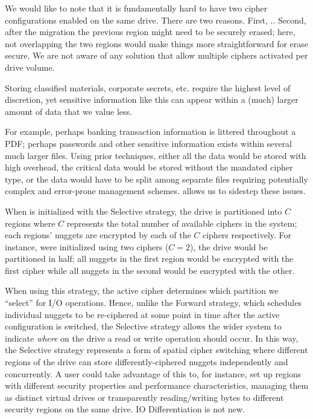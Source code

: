 We would like to note that it is fundamentally hard to have two cipher
configurations enabled on the same drive. There are two reasons. First,
.. Second, after the migration the
previous region might need to be securely erased; here, not overlapping the two
regions would make things more straightforward for erase secure. We are not
aware of any solution that allow multiple ciphers activated per drive volume.



 Storing classified materials, corporate secrets,
etc. require the highest level of discretion, yet sensitive information like
this can appear within a (much) larger amount of data that we value less.

For example, perhaps banking transaction information is littered throughout a
PDF; perhaps passwords and other sensitive information exists within several
much larger files. Using prior techniques, either all the data would be stored
with high overhead, the critical data would be stored without the mandated
cipher type, or the data would have to be split among separate files requiring
potentially complex and error-prone management schemes. \sys allows us to
sidestep these issues.


When \sys is initialized with the Selective strategy, the drive is partitioned
into $C$ regions where $C$ represents the total number of available ciphers in
the system; each regions' nuggets are encrypted by each of the $C$ ciphers
respectively. For instance, were \sys initialized using two ciphers ($C = 2$),
the drive would be partitioned in half; all nuggets in the first region would be
encrypted with the first cipher while all nuggets in the second would be
encrypted with the other.

When using this strategy, the active cipher determines which partition we
``select'' for I/O operations. Hence, unlike the Forward strategy, which
schedules individual nuggets to be re-ciphered at some point in time after the
active configuration is switched, the Selective strategy allows the wider system
to indicate \emph{where} on the drive a read or write operation should occur. In
this way, the Selective strategy represents a form of spatial cipher switching
where different regions of the drive can store differently-ciphered nuggets
independently and concurrently. A user could take advantage of this to, for
instance, set up regions with different security properties and performance
characteristics, managing them as distinct virtual drives or transparently
reading/writing bytes to different security regions on the same drive. IO
Differentiation is not new.
